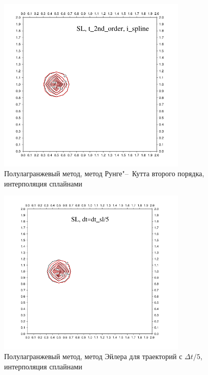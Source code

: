 \begin{figure}[ht] 
	\centering
	\includegraphics[width=0.8\textwidth,height=0.8\textwidth]{images/6_7}
	\caption{Полулагранжевый метод, метод Рунге"--~Кутта второго порядка, интерполяция сплайнами}
	\label{img:6_7}
\end{figure}
%
%
\begin{figure}[ht] 
	\centering
	\includegraphics[width=0.8\textwidth,height=0.8\textwidth]{images/6_8}
	\caption{Полулагранжевый метод, метод Эйлера для траекторий с $\Delta t/5$, интерполяция сплайнами}
	\label{img:6_8}
\end{figure}
